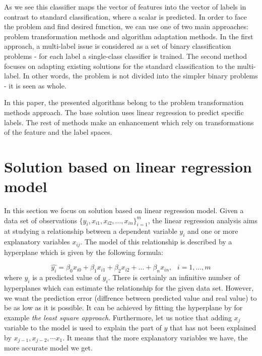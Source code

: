 As we see this classifier maps the vector of features into the vector of labels in contrast to standard classification, where a scalar is predicted. In order to face the problem and find desired function, we can use one of two main approaches: problem transformation methods and algorithm adaptation methods. In the first approach, a multi-label issue is considered as a set of binary classification problems - for each label a single-class classifier is trained. The second method focuses on adapting existing solutions for the standard classification to the multi-label. In other words, the problem is not divided into the simpler binary problems - it is seen as whole.

In this paper, the presented algorithms belong to the problem transformation methods approach. The base solution uses linear regression to predict specific labels. The rest of methods make an enhancement which rely on transformations of the feature and the label spaces. 

\section{Solution based on linear regression model}

In this section we focus on solution based on linear regression model. Given a data set of observations $\{y_i, x_{i1}, x_{i2}, \dots, x_{in}\}_{i=1}^{m}$, the linear regression analysis aims at studying a relationship between a dependent variable $y_i$ and one or more explanatory variables $x_{ij}$. The model of this relationship is described by a hyperplane which is given by the following formula:

\begin{equation}\label{eq:LR1}
    \hat{y_i} = \beta_0x_{i0} + \beta_1x_{i1} + \beta_2x_{i2} + \dots + \beta_nx_{in}, \text{ } i=1, \dots, m
\end{equation}
where $\hat{y_i}$ is a predicted value of $y_i$. 
There is certainly an infinitive number of hyperplanes which can estimate the relationship for the given data set. However, we want the prediction error (diffrence between predicted value and real value) to be as low as it is possible. It can be achieved by fitting the hyperplane by for example \textit{the least square approach}. Furthermore, let us notice that adding $x_j$ variable to the model is used to explain the part of $y$ that has not been explained by $x_{j-1}, x_{j-2}, \cdots x_1$. It means that the more explanatory variables we have, the more accurate model we get.

